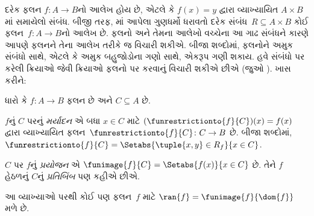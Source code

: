 \documentclass[../../../include/open-logic-section]{subfiles}
\begin{document}
\begin{explain}
દરેક ફલન $f\colon A \to B$નો આલેખ હોય છે, એટલે કે
$f(x) = y$ દ્વારા વ્યાખ્યાયિત $A
\times B$માં સમાયેલો સંબંધ. બીજી તરફ,
માં આપેલા ગુણધર્મો ધરાવતો
દરેક સંબંધ~$R
\subseteq A \times B$ કોઈ ફલન~$f \colon A \to
B$નો આલેખ છે. ફલનો અને તેમના આલેખો વચ્ચેના આ ગાઢ
સંબંધને કારણે આપણે ફલનને તેના આલેખ તરીકે જ વિચારી શકીએ.
બીજા શબ્દોમાં, ફલનોને અમુક સંબંધો સાથે, એટલે કે અમુક
બહુજોડોના ગણો સાથે, એકરૂપ ગણી શકાય.
હવે સંબંધો પર કરેલી ક્રિયાઓ જેવી ક્રિયાઓ ફલનો પર
કરવાનું વિચારી શકીએ છીએ (જુઓ ).
ખાસ કરીને:
\end{explain}

\begin{defn}
ધારો કે $f \colon A \to B$ ફલન છે અને $C\subseteq A$ છે.

$f$નું $C$ પરનું \emph{મર્યાદન} એ બધા $x \in C$ માટે
$(\funrestrictionto{f}{C})(x) = f(x)$ દ્વારા વ્યાખ્યાયિત
ફલન~$\funrestrictionto{f}{C}\colon C \to B$ છે.
બીજા શબ્દોમાં, $\funrestrictionto{f}{C} = \Setabs{\tuple{x, y} \in R_f}{x \in
C}$.

$C$ પર $f$નું \emph{પ્રયોજન} એ $\funimage{f}{C} =
\Setabs{f(x)}{x \in C}$ છે. તેને $f$ હેઠળનું
$C$નું \emph{પ્રતિબિંબ} પણ કહીએ છીએ.
\end{defn}

\begin{explain}
આ વ્યાખ્યાઓ પરથી કોઈ પણ ફલન~$f$ માટે
$\ran{f} =
\funimage{f}{\dom{f}}$ મળે છે.
\end{explain}
\end{document}
